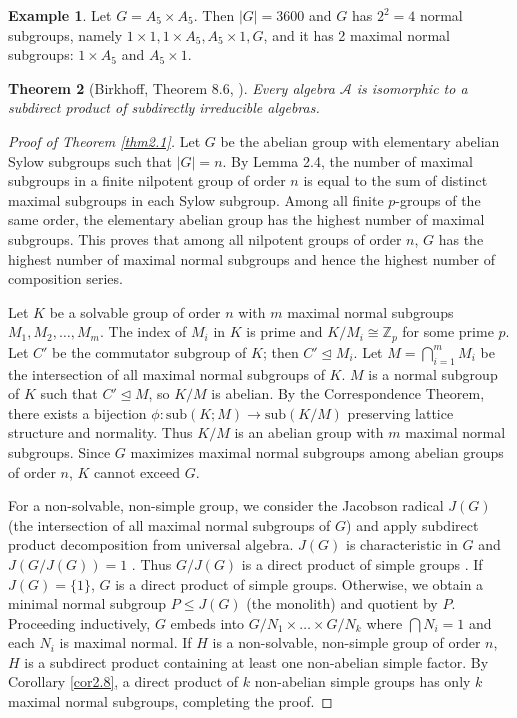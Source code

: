 \documentclass[11pt,a4paper]{article}
\newtheorem{theorem}{Theorem}[section]
\theoremstyle{definition}
\newtheorem{example}[theorem]{Example}
\begin{document}
\begin{example}
Let $G = A_5 \times A_5$. Then $|G| = 3600$ and $G$ has $2^2 = 4$ normal subgroups, namely $1 \times 1, 1 \times A_5, A_5 \times 1, G$, and it has 2 maximal normal subgroups: $1 \times A_5$ and $A_5 \times 1$.
\end{example}

\begin{theorem}[Birkhoff, Theorem 8.6, \cite{burris}]
Every algebra $\mathcal{A}$ is isomorphic to a subdirect product of subdirectly irreducible algebras.
\end{theorem}

\begin{proof}[Proof of Theorem \ref{thm2.1}]
Let $G$ be the abelian group with elementary abelian Sylow subgroups such that $|G| = n$. By Lemma 2.4, the number of maximal subgroups in a finite nilpotent group of order $n$ is equal to the sum of distinct maximal subgroups in each Sylow subgroup. Among all finite $p$-groups of the same order, the elementary abelian group has the highest number of maximal subgroups. This proves that among all nilpotent groups of order $n$, $G$ has the highest number of maximal normal subgroups and hence the highest number of composition series.

Let $K$ be a solvable group of order $n$ with $m$ maximal normal subgroups $M_1, M_2, \dots, M_m$. The index of $M_i$ in $K$ is prime and $K/M_i \cong \mathbb{Z}_p$ for some prime $p$. Let $C'$ be the commutator subgroup of $K$; then $C' \unlhd M_i$. Let $M = \bigcap_{i=1}^m M_i$ be the intersection of all maximal normal subgroups of $K$. $M$ is a normal subgroup of $K$ such that $C' \unlhd M$, so $K/M$ is abelian. By the Correspondence Theorem, there exists a bijection $\phi : \text{sub}(K; M) \to \text{sub}(K/M)$ preserving lattice structure and normality. Thus $K/M$ is an abelian group with $m$ maximal normal subgroups. Since $G$ maximizes maximal normal subgroups among abelian groups of order $n$, $K$ cannot exceed $G$.

For a non-solvable, non-simple group, we consider the Jacobson radical $J(G)$ (the intersection of all maximal normal subgroups of $G$) and apply subdirect product decomposition from universal algebra. $J(G)$ is characteristic in $G$ and $J(G/J(G)) = 1$ \cite{guyot}. Thus $G/J(G)$ is a direct product of simple groups \cite{borovik}. If $J(G) = \{1\}$, $G$ is a direct product of simple groups. Otherwise, we obtain a minimal normal subgroup $P \le J(G)$ (the monolith) and quotient by $P$. Proceeding inductively, $G$ embeds into $G/N_1 \times \dots \times G/N_k$ where $\bigcap N_i = 1$ and each $N_i$ is maximal normal. If $H$ is a non-solvable, non-simple group of order $n$, $H$ is a subdirect product containing at least one non-abelian simple factor. By Corollary \ref{cor2.8}, a direct product of $k$ non-abelian simple groups has only $k$ maximal normal subgroups, completing the proof.
\end{proof}
\end{document}
